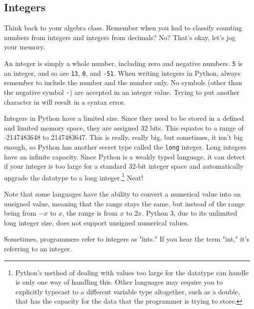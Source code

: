 \subsection{Integers}
Think back to your algebra class. Remember when you had to classify counting numbers from integers and integers from decimals? No? That's okay, let's jog your memory.\par
An integer is simply a whole number, including zero and negative numbers. \verb|5| is an integer, and so are \verb|13|, \verb|0|, and \verb|-51|. When writing integers in Python, always remember to include the number and the number only. No symbols (other than the negative symbol \verb|-|) are accepted in an integer value. Trying to put another character in will result in a syntax error.\par
Integers in Python have a limited size. Since they need to be stored in a defined and limited memory space, they are assigned 32 bits. This equates to a range of -2147483648 to 2147483647. This is really, really big, but sometimes, it isn't big enough, so Python has another secret type called the \verb|long| integer. Long integers have an infinite capacity. Since Python is a weakly typed language, it can detect if your integer is too large for a standard 32-bit integer space and automatically upgrade the datatype to a long integer.\footnote{Python's method of dealing with values too large for the datatype can handle is only one way of handling this. Other languages may require you to explicitly typecast to a different variable type altogether, such as a double, that has the capacity for the data that the programmer is trying to store.} Neat!\par
Note that some languages have the ability to convert a numerical value into an unsigned value, meaning that the range stays the same, but instead of the range being from $-x$ to $x$, the range is from $x$ to $2x$. Python 3, due to its unlimited long integer size, does not support unsigned numerical values.\par
{}
Sometimes, programmers refer to integers as "ints." If you hear the term "int," it's referring to an integer.\par
{}
